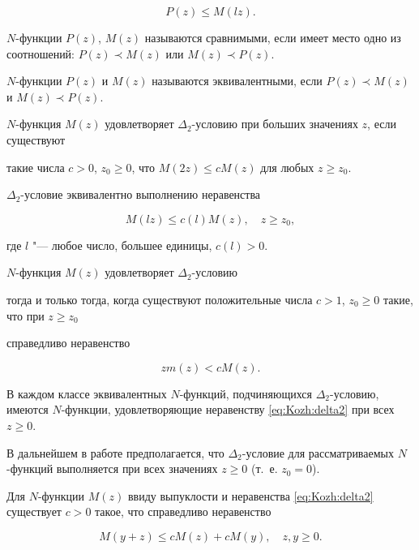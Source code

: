 $$

P(z)\leq M(lz).

$$

$N$-функции $P(z)$, $M(z)$ называются сравнимыми, если имеет место одно из соотношений: $P(z)\prec M(z)$ или $M(z)\prec P(z)$.

$N$-функции $P(z)$ и $M(z)$ называются эквивалентными, если $P(z)\prec M(z)$ и $M(z)\prec P(z)$.



$N$-функция $M(z)$ удовлетворяет $\Delta_2$-условию  при больших значениях $z$, если существуют

такие числа $c>0$, $z_0\geq0$, что $M(2z)\leq cM(z)$ для любых $z\geq z_0$.

$\Delta_2$-условие  эквивалентно выполнению  неравенства

\begin{equation}\label{eq:Kozh:delta2}

M(lz)\leq c(l)M(z),\quad z\geq z_0,

\end{equation}

где $l$ "--- любое число, большее единицы, $c(l)>0$.



$N$-функция $M(z)$ удовлетворяет $\Delta_2$-условию

тогда и только тогда, когда существуют положительные числа $c>1$, $z_0\geq 0$ такие, что при $z\geq z_0$

справедливо неравенство

\begin{equation}\label{eq:Kozh:usl}

  {zm(z)}<c{M(z)}.

\end{equation}

В каждом классе эквивалентных $N$-функций, подчиняющихся $\Delta_2$-условию, имеются $N$-функции, удовлетворяющие неравенству \eqref{eq:Kozh:delta2} при всех $z\geq 0$.

В дальнейшем в работе предполагается, что $\Delta_2$-условие для рассматриваемых $N$-функций выполняется  при всех значениях $z\geq0$  (т.~е. $z_0=0$).



Для $N$-функции $M(z)$ ввиду выпуклости и неравенства \eqref{eq:Kozh:delta2} существует $c>0$ такое, что справедливо неравенство

\begin{equation}\label{eq:Kozh:sum}

M(y+z)\leq c M(z)+c M(y),\quad z,y\geq 0.

\end{equation}



